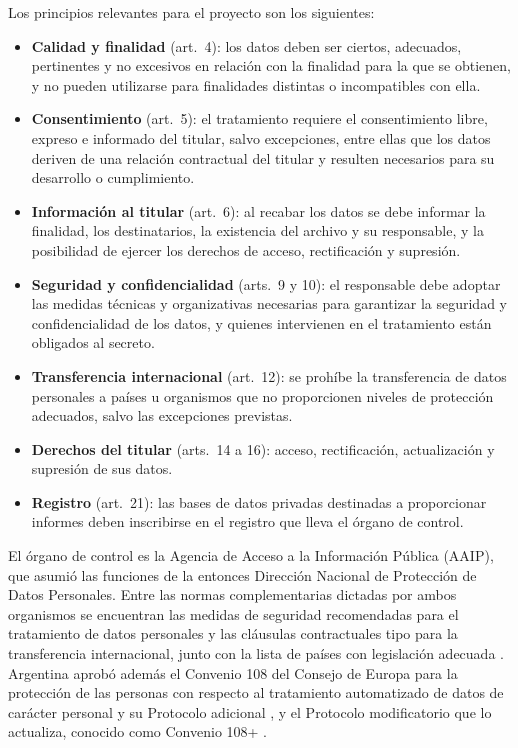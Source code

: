 Los principios relevantes para el proyecto son los siguientes:
\begin{itemize}
  \item \textbf{Calidad y finalidad} (art.~4): los datos deben ser ciertos, adecuados, pertinentes
        y no excesivos en relación con la finalidad para la que se obtienen, y no pueden utilizarse
        para finalidades distintas o incompatibles con ella.
  \item \textbf{Consentimiento} (art.~5): el tratamiento requiere el consentimiento libre, expreso
        e informado del titular, salvo excepciones, entre ellas que los datos deriven de una relación
        contractual del titular y resulten necesarios para su desarrollo o cumplimiento.
  \item \textbf{Información al titular} (art.~6): al recabar los datos se debe informar la
        finalidad, los destinatarios, la existencia del archivo y su responsable, y la posibilidad de
        ejercer los derechos de acceso, rectificación y supresión.
  \item \textbf{Seguridad y confidencialidad} (arts.~9 y 10): el responsable debe adoptar las
        medidas técnicas y organizativas necesarias para garantizar la seguridad y confidencialidad
        de los datos, y quienes intervienen en el tratamiento están obligados al secreto.
  \item \textbf{Transferencia internacional} (art.~12): se prohíbe la transferencia de datos
        personales a países u organismos que no proporcionen niveles de protección adecuados, salvo
        las excepciones previstas.
  \item \textbf{Derechos del titular} (arts.~14 a 16): acceso, rectificación, actualización y
        supresión de sus datos.
  \item \textbf{Registro} (art.~21): las bases de datos privadas destinadas a proporcionar
        informes deben inscribirse en el registro que lleva el órgano de control.
\end{itemize}

El órgano de control es la Agencia de Acceso a la Información Pública (AAIP), que asumió las
funciones de la entonces Dirección Nacional de Protección de Datos Personales. Entre las normas
complementarias dictadas por ambos organismos se encuentran las medidas de seguridad recomendadas
para el tratamiento de datos personales \parencite{AAIP2018} y las cláusulas contractuales tipo
para la transferencia internacional, junto con la lista de países con legislación adecuada
\parencite{DNPDP2016}. Argentina aprobó además el Convenio 108 del Consejo de Europa para la
protección de las personas con respecto al tratamiento automatizado de datos de carácter personal y
su Protocolo adicional \parencite{Ley27483}, y el Protocolo modificatorio que lo actualiza,
conocido como Convenio 108+ \parencite{Ley27699}.

